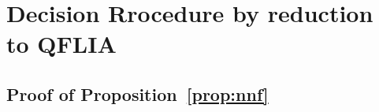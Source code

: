 
\section{Decision Rrocedure by reduction to QFLIA}
\label{app:fsimple}


\subsection{Proof of Proposition~\ref{prop:nnf}}
\label{proof:prop:nnf}



